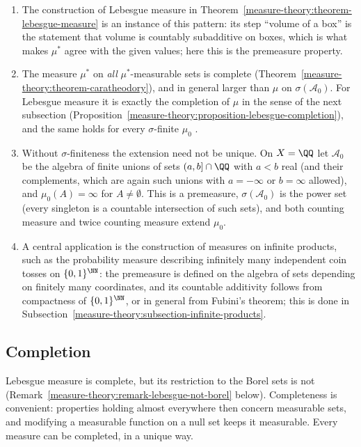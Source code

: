 \begin{remark}\label{measure-theory:remark-extension}
\begin{enumerate}
\item The construction of Lebesgue measure in Theorem~\ref{measure-theory:theorem-lebesgue-measure} is an instance of this pattern: its step ``volume of a box'' is the statement that volume is
countably subadditive on boxes, which is what makes $\mu^*$ agree with the given values; here this is the premeasure property.
\item The measure $\mu^*$ on \emph{all} $\mu^*$-measurable sets is complete (Theorem~\ref{measure-theory:theorem-caratheodory}), and in general larger than $\mu$ on $\sigma(\mathcal{A}_0)$. For
Lebesgue measure it is exactly the completion of $\mu$ in the sense of the next subsection (Proposition~\ref{measure-theory:proposition-lebesgue-completion}), and the same holds for
every $\sigma$-finite $\mu_0$ \cite[Section 1.4]{folland-real}.
\item Without $\sigma$-finiteness the extension need not be unique. On $X = \QQ$ let $\mathcal{A}_0$ be the algebra of finite unions of sets $(a, b] \cap \QQ$ with $a < b$ real (and their complements, which
are again such unions with $a = -\infty$ or $b = \infty$ allowed), and $\mu_0(A) = \infty$ for $A \neq \emptyset$. This is a premeasure, $\sigma(\mathcal{A}_0)$ is the power set (every singleton is a
countable intersection of such sets), and both counting measure and twice counting measure extend $\mu_0$.
\item A central application is the construction of measures on infinite products, such as the probability measure describing infinitely many independent coin tosses on $\{0, 1\}^\NN$: the premeasure is
defined on the algebra of sets depending on finitely many coordinates, and its countable additivity follows from compactness of $\{0, 1\}^\NN$, or in general from Fubini's theorem; this is done in
Subsection~\ref{measure-theory:subsection-infinite-products}.
\end{enumerate}
\end{remark}

\subsection{Completion}\label{measure-theory:subsection-completion}

Lebesgue measure is complete, but its restriction to the Borel sets is not (Remark~\ref{measure-theory:remark-lebesgue-not-borel} below). Completeness is convenient: properties holding almost
everywhere then concern measurable sets, and modifying a measurable function on a null set keeps it measurable. Every measure can be completed, in a unique way.

